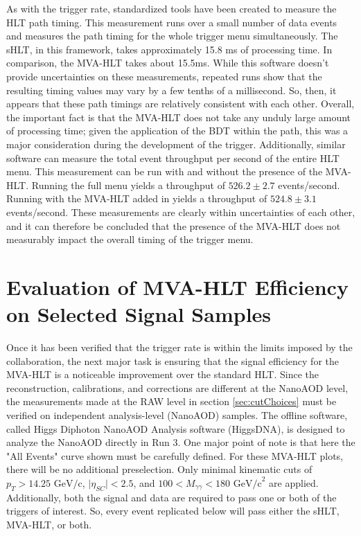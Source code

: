\documentclass[12pt]{ucsddissertation}
\begin{document}
As with the trigger rate, standardized tools have been created to measure the HLT path timing. This measurement runs over a small number of data events and measures the path timing for the whole trigger menu simultaneously. The sHLT, in this framework, takes approximately 15.8 ms of processing time. In comparison, the MVA-HLT takes about 15.5ms. While this software doesn't provide uncertainties on these measurements, repeated runs show that the resulting timing values may vary by a few tenths of a millisecond. So, then, it appears that these path timings are relatively consistent with each other. Overall, the important fact is that the MVA-HLT does not take any unduly large amount of processing time; given the application of the BDT within the path, this was a major consideration during the development of the trigger. Additionally, similar software can measure the total event throughput per second of the entire HLT menu. This measurement can be run with and without the presence of the MVA-HLT. Running the full menu yields a throughput of $526.2 \pm 2.7$ events/second. Running with the MVA-HLT added in yields a throughput of $524.8 \pm 3.1$ events/second. These measurements are clearly within uncertainties of each other, and it can therefore be concluded that the presence of the MVA-HLT does not measurably impact the overall timing of the trigger menu. 

\section{Evaluation of MVA-HLT Efficiency on Selected Signal Samples}
Once it has been verified that the trigger rate is within the limits imposed by the collaboration, the next major task is ensuring that the signal efficiency for the MVA-HLT is a noticeable improvement over the standard HLT.  Since the reconstruction, calibrations, and corrections are different at the NanoAOD level, the measurements made at the RAW level in section \ref{sec:cutChoices} must be verified on independent analysis-level (NanoAOD) samples. The offline software, called Higgs Diphoton NanoAOD Analysis software (HiggsDNA), is designed to analyze the NanoAOD directly in Run 3. One major point of note is that here the "All Events" curve shown must be carefully defined. For these MVA-HLT plots, there will be no additional preselection. Only minimal kinematic cuts of $p_T > 14.25$ $\mathrm{GeV/c}$, $\lvert \eta_{SC} \rvert < 2.5$, and $100 < M_{\gamma \gamma} < 180$ $\mathrm{GeV/c}^2$ are applied. Additionally, both the signal and data are required to pass one or both of the triggers of interest. So, every event replicated below will pass either the sHLT, MVA-HLT, or both. 
\end{document}
